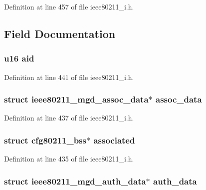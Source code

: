 Definition at line 457 of file ieee80211\-\_\-i.\-h.



\subsection{Field Documentation}
\hypertarget{structieee80211__if__managed_a57f670786e3ff8b4229d4a3cb97a63a0}{
\subsubsection[{aid}]{\setlength{\rightskip}{0pt plus 5cm}u16 aid}}\label{structieee80211__if__managed_a57f670786e3ff8b4229d4a3cb97a63a0}


Definition at line 441 of file ieee80211\-\_\-i.\-h.

\hypertarget{structieee80211__if__managed_a33bf96711b0af50fb5ed9bbb3e912720}{
\subsubsection[{assoc\-\_\-data}]{\setlength{\rightskip}{0pt plus 5cm}struct {\bf ieee80211\-\_\-mgd\-\_\-assoc\-\_\-data}$\ast$ assoc\-\_\-data}}\label{structieee80211__if__managed_a33bf96711b0af50fb5ed9bbb3e912720}


Definition at line 437 of file ieee80211\-\_\-i.\-h.

\hypertarget{structieee80211__if__managed_aa0d8552cc543334097401fdff5a5d74e}{
\subsubsection[{associated}]{\setlength{\rightskip}{0pt plus 5cm}struct cfg80211\-\_\-bss$\ast$ associated}}\label{structieee80211__if__managed_aa0d8552cc543334097401fdff5a5d74e}


Definition at line 435 of file ieee80211\-\_\-i.\-h.

\hypertarget{structieee80211__if__managed_a5736366c204cb94c1db9e4e65a0df203}{
\subsubsection[{auth\-\_\-data}]{\setlength{\rightskip}{0pt plus 5cm}struct {\bf ieee80211\-\_\-mgd\-\_\-auth\-\_\-data}$\ast$ auth\-\_\-data}}\label{structieee80211__if__managed_a5736366c204cb94c1db9e4e65a0df203}


